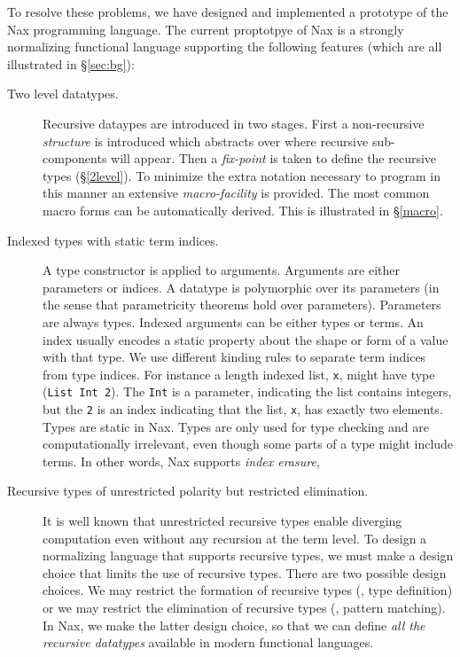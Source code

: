 To resolve these problems, we have designed and implemented a prototype of
the Nax programming language. The current proptotpye of Nax is a
strongly normalizing functional language supporting the following features
(which are all illustrated in \S\ref{sec:bg}):
\begin{description}

\item[Two level datatypes.]
Recursive dataypes are introduced in two stages. First a non-recursive
{\em structure} is introduced which abstracts over where recursive
sub-components will appear. Then a {\em fix-point} is taken to define
the recursive types (\S \ref{2level}). To minimize the extra notation necessary to program
in this manner an extensive {\em macro-facility} is provided. The most common
macro forms can be automatically derived. This is illustrated in \S\ref{macro}.

\item[Indexed types with static term indices.]
A type constructor is applied to arguments. Arguments
are either parameters or indices. A datatype is polymorphic over
its parameters (in the sense that parametricity theorems hold over parameters).
Parameters are always types.
Indexed arguments can be either types or terms. An index usually
encodes a static property about the shape or form of a value with
that type. We use different kinding rules to separate
term indices from type indices. For instance a length indexed list, \verb+x+,
might have type (\verb+List Int 2+). The \verb+Int+ is a parameter, indicating
the list contains integers, but the \verb+2+ is an index indicating
that the list, \verb+x+, has exactly two elements.
Types are static in Nax. Types are only used for type checking
and are computationally irrelevant, even though some parts of a type might include terms.
In other words, Nax supports \emph{index erasure},

\item[Recursive types of unrestricted polarity but restricted elimination.]
It is well known that unrestricted recursive types enable diverging computation
even without any recursion at the term level. To design a normalizing language
that supports recursive types, we must make a design choice that limits
the use of recursive types. There are two possible
design choices. We may restrict the formation of recursive types
(\ie, type definition) or we may restrict the elimination of recursive types
(\ie, pattern matching). In Nax, we make the latter design choice, so that we can
define \emph{all the recursive datatypes} available in modern functional languages.


\end{description}
